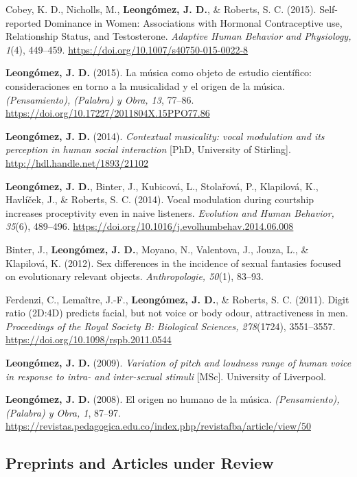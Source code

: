 \documentclass[11pt,a4paper,]{awesome-cv}
\begin{document}
Cobey, K. D., Nicholls, M., \textbf{Leongómez, J. D.}, \& Roberts, S. C.
(2015). Self-reported Dominance in Women: Associations with Hormonal
Contraceptive use, Relationship Status, and Testosterone. \emph{Adaptive
Human Behavior and Physiology, 1}(4), 449--459.
\url{https://doi.org/10.1007/s40750-015-0022-8}

\textbf{Leongómez, J. D.} (2015). La música como objeto de estudio
científico: consideraciones en torno a la musicalidad y el origen de la
música. \emph{(Pensamiento), (Palabra) y Obra, 13}, 77--86.
\url{https://doi.org/10.17227/2011804X.15PPO77.86}

\textbf{Leongómez, J. D.} (2014). \emph{Contextual musicality: vocal
modulation and its perception in human social interaction} {[}PhD,
University of Stirling{]}. \url{http://hdl.handle.net/1893/21102}

\textbf{Leongómez, J. D.}, Binter, J., Kubicová, L., Stolařová, P.,
Klapilová, K., Havlíček, J., \& Roberts, S. C. (2014). Vocal modulation
during courtship increases proceptivity even in naive listeners.
\emph{Evolution and Human Behavior, 35}(6), 489--496.
\url{https://doi.org/10.1016/j.evolhumbehav.2014.06.008}

Binter, J., \textbf{Leongómez, J. D.}, Moyano, N., Valentova, J., Jouza,
L., \& Klapilová, K. (2012). Sex differences in the incidence of sexual
fantasies focused on evolutionary relevant objects. \emph{Anthropologie,
50}(1), 83--93.

Ferdenzi, C., Lemaître, J.-F., \textbf{Leongómez, J. D.}, \& Roberts, S.
C. (2011). Digit ratio (2D:4D) predicts facial, but not voice or body
odour, attractiveness in men. \emph{Proceedings of the Royal Society B:
Biological Sciences, 278}(1724), 3551--3557.
\url{https://doi.org/10.1098/rspb.2011.0544}

\textbf{Leongómez, J. D.} (2009). \emph{Variation of pitch and loudness
range of human voice in response to intra- and inter-sexual stimuli}
{[}MSc{]}. University of Liverpool.

\textbf{Leongómez, J. D.} (2008). El origen no humano de la música.
\emph{(Pensamiento), (Palabra) y Obra, 1}, 87--97.
\url{https://revistas.pedagogica.edu.co/index.php/revistafba/article/view/50}

\endgroup

\hypertarget{section-1}{%
\subsection{\texorpdfstring{\textbf{Preprints and Articles under Review}}{}}\label{section-1}}
\end{document}
